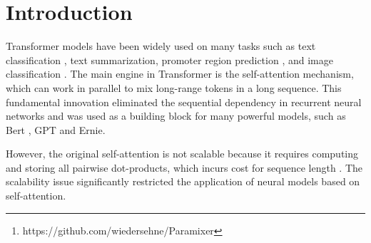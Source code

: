\documentclass{article}
\begin{document}
\begin{abstract}
Self-Attention is a widely used building block in neural modeling to mix long-range data elements. Most self-attention neural networks employ pairwise dot-products to specify the attention coefficients. However, these methods require  computing cost for sequence length . Even though some approximation methods have been introduced to relieve the quadratic cost, the performance of the dot-product approach is still bottlenecked by the low-rank constraint in the attention matrix factorization. In this paper, we propose a novel scalable and effective mixing building block called Paramixer. Our method factorizes the interaction matrix into several sparse matrices, where we parameterize the non-zero entries by MLPs with the data elements as input. The overall computing cost of the new building block is as low as . Moreover, all factorizing matrices in Paramixer are full-rank, so it does not suffer from the low-rank bottleneck. We have tested the new method on both synthetic and various real-world long sequential data sets and compared it with several state-of-the-art attention networks. The experimental results show that Paramixer has better performance in most learning tasks.\footnote{https://github.com/wiedersehne/Paramixer}
\end{abstract}
	
	
	
	
\section{Introduction}
\label{sec:intro}

Transformer models have been widely used on many tasks such as text classification \cite{vaswani2017attention}, text summarization, promoter region prediction \cite{zaheer2020big}, and image classification \cite{dosovitskiy2020vit}. The main engine in Transformer is the self-attention mechanism, which can work in parallel to mix long-range tokens in a long sequence. This fundamental innovation eliminated the sequential dependency in recurrent neural networks and was used as a building block for many powerful models, such as Bert \cite{devlin2018bert}, GPT\cite{brown2020gpt} and Ernie\cite{sun2019ernie}. 

However, the original self-attention is not scalable because it requires computing and storing all pairwise dot-products, which incurs  cost for sequence length . The scalability issue significantly restricted the application of neural models based on self-attention.
\end{document}
